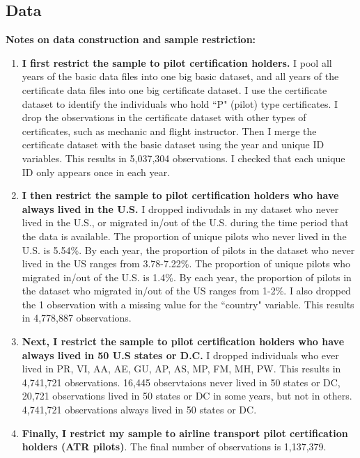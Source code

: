 \documentclass[11pt]{article}
\begin{document}
\subsection{Data}
\noindent
\textbf{Notes on data construction and sample restriction: }
\begin{enumerate}
	\item \textbf{I first restrict the sample to pilot certification holders.} I pool all years of the basic data files into one big basic dataset, and all years of the certificate data files into one big certificate dataset. I use the certificate dataset to identify the individuals who hold ``P" (pilot) type certificates. I drop the observations in the certificate dataset with other types of certificates, such as mechanic and flight instructor. Then I merge the certificate dataset with the basic dataset using the year and unique ID variables. This results in 5,037,304 observations. I checked that each unique ID only appears once in each year.
	
	\item \textbf{I then restrict the sample to pilot certification holders who have always lived in the U.S.} I dropped indivudals in my dataset who never lived in the U.S., or migrated in/out of the U.S. during the time period that the data is available. The proportion of unique pilots who never lived in the U.S. is 5.54\%. By each year, the proportion of pilots in the dataset who never lived in the US ranges from 3.78-7.22\%. The proportion of unique pilots who migrated in/out of the U.S. is 1.4\%. By each year, the proportion of pilots in the dataset who migrated in/out of the US ranges from 1-2\%. I also dropped the 1 observation with a missing value for the ``country" variable. This results in 4,778,887 observations.
	
	\item \textbf{Next, I restrict the sample to pilot certification holders who have always lived in 50 U.S states or D.C.} I dropped individuals who ever lived in PR, VI, AA, AE, GU, AP, AS, MP, FM, MH, PW. This results in 4,741,721 observations. 16,445 observtaions never lived in 50 states or DC, 20,721 observations lived in 50 states or DC in some years, but not in others. 4,741,721 observations always lived in 50 states or DC.  
	
	\item \textbf{Finally, I restrict my sample to airline transport pilot certification holders (ATR pilots)}. The final number of observations is 1,137,379. 
	\end{enumerate}
\end{document}
